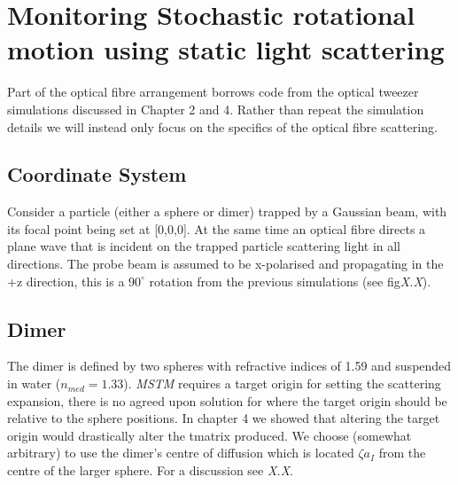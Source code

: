 \section{Monitoring Stochastic rotational motion using static 
		light scattering}
Part of the optical fibre arrangement borrows code from the 
optical tweezer simulations discussed in Chapter 2 and 4. 
Rather than repeat the simulation details we will instead 
only focus on the specifics of the optical fibre scattering.

\subsection{Coordinate System}
Consider a particle (either a sphere or dimer) trapped by
a Gaussian beam, with its focal point being set at [0,0,0]. 
At the same time an optical fibre directs a plane wave that 
is incident on the trapped particle scattering light in all 
directions. The probe beam is assumed to be x-polarised and 
propagating in the +z direction, this is a $90^{\circ}$ 
rotation from the previous simulations (see fig\emph{X.X}). 

\subsection{Dimer}
The dimer is defined by two spheres with refractive indices
of 1.59 and suspended in water ($n_{med} = 1.33$). \textit{MSTM}
requires a target origin for setting the scattering expansion, 
there is no agreed upon solution for where the target origin 
should be relative to the sphere positions. In chapter 4 we showed
that altering the target origin would drastically alter the 
tmatrix produced. We choose (somewhat arbitrary) to use 
the dimer's centre of diffusion which is located $\zeta a_I$ from 
the centre of the larger sphere. For a discussion see \emph{X.X}.

